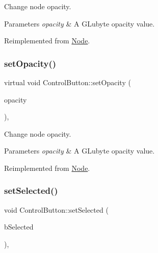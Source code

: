 Change node opacity. 
\begin{DoxyParams}{Parameters}
{\em opacity} & A G\+Lubyte opacity value. \\
\hline
\end{DoxyParams}


Reimplemented from \hyperlink{classNode_ae41a9db63bfa3d466ee7c9d79c35352d}{Node}.

\mbox{\label{classControlButton_adfe6c80adc5ba24d50d21f5ff742f6a1}} 
\subsubsection{\texorpdfstring{set\+Opacity()}{setOpacity()}\hspace{0.1cm}{\footnotesize\ttfamily [2/2]}}
{\footnotesize\ttfamily virtual void Control\+Button\+::set\+Opacity (\begin{DoxyParamCaption}\item[{G\+Lubyte}]{opacity }\end{DoxyParamCaption})\hspace{0.3cm}{\ttfamily [override]}, {\ttfamily [virtual]}}

Change node opacity. 
\begin{DoxyParams}{Parameters}
{\em opacity} & A G\+Lubyte opacity value. \\
\hline
\end{DoxyParams}


Reimplemented from \hyperlink{classNode_ae41a9db63bfa3d466ee7c9d79c35352d}{Node}.

\mbox{\label{classControlButton_ae096d582a2e0b072677fa2db84f4ff78}} 
\subsubsection{\texorpdfstring{set\+Selected()}{setSelected()}\hspace{0.1cm}{\footnotesize\ttfamily [1/2]}}
{\footnotesize\ttfamily void Control\+Button\+::set\+Selected (\begin{DoxyParamCaption}\item[{bool}]{b\+Selected }\end{DoxyParamCaption})\hspace{0.3cm}{\ttfamily [override]}, {\ttfamily [virtual]}}

